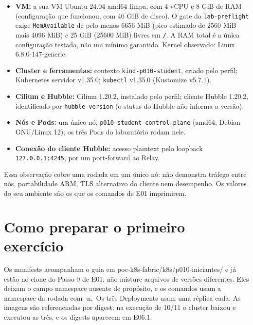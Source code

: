\documentclass[12pt,openany,oneside,a4paper,chapter=TITLE,english,brazil]{abntex2}
\providecommand{\tightlist}{\setlength{\itemsep}{0pt}\setlength{\parskip}{0pt}}
\begin{document}
\begin{itemize}
\tightlist
\item
  \textbf{VM:} a sua VM Ubuntu 24.04 amd64 limpa, com 4 vCPU e 8 GiB de RAM (configuração que funcionou, com 40 GiB de disco). O gate do \texttt{lab-{}\allowbreak{}preflight} exige \texttt{Mem\allowbreak{}Available} de pelo menos 6656 MiB (pico estimado de 2560 MiB mais 4096 MiB) e 25 GiB (25600 MiB) livres em \texttt{/\allowbreak{}}. A RAM total é a única configuração testada, não um mínimo garantido. Kernel observado: Linux 6.8.0-147-generic.
\item
  \textbf{Cluster e ferramentas:} contexto \texttt{kind-{}\allowbreak{}p010-{}\allowbreak{}student}, criado pelo perfil; Kubernetes servidor v1.35.0; \texttt{kubectl} v1.35.0 (Kustomize v5.7.1).
\item
  \textbf{Cilium e Hubble:} Cilium 1.20.2, instalado pelo perfil; cliente Hubble 1.20.2, identificado por \texttt{hubble version} (o status do Hubble não informa a versão).
\item
  \textbf{Nós e Pods:} um único nó, \texttt{p010-{}\allowbreak{}student-{}\allowbreak{}control-{}\allowbreak{}plane} (amd64, Debian GNU/Linux 12); os três Pods do laboratório rodam nele.
\item
  \textbf{Conexão do cliente Hubble:} acesso plaintext pelo loopback \texttt{127.\allowbreak{}0.\allowbreak{}0.\allowbreak{}1:\allowbreak{}4245}, por um port-forward ao Relay.
\end{itemize}

Essa observação cobre uma rodada em um único nó: não demonstra tráfego entre nós, portabilidade ARM, TLS alternativo do cliente nem desempenho. Os valores do seu ambiente são os que os comandos de E01 imprimirem.

\section*{Como preparar o primeiro exercício}\label{como-preparar-o-primeiro-exercuxedcio}

Os manifests acompanham o guia em poc-k8s-fabric/k8s/p010-iniciantes/ e já estão no clone do Passo 0 de E01; não misture arquivos de versões diferentes. Eles deixam o campo namespace ausente de propósito, e os comandos usam a namespace da rodada com -n.~Os três Deployments usam uma réplica cada. As imagens são referenciadas por digest; na execução de 10/11 o cluster baixou e executou as três, e os digests aparecem em E06.1.
\end{document}
